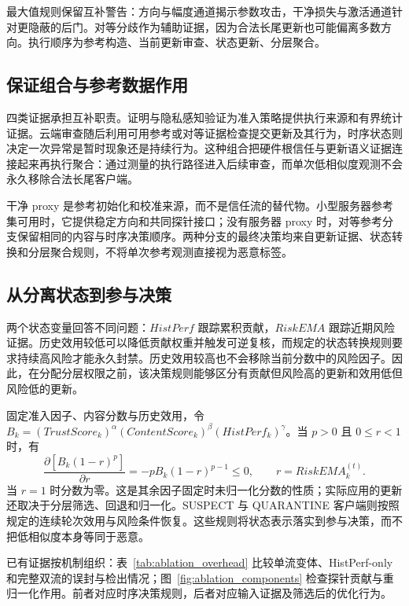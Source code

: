 \documentclass[10pt,a4paper,UTF8,fontset=fandol]{ctexart}
\begin{document}
最大值规则保留互补警告：方向与幅度通道揭示参数攻击，干净损失与激活通道针对更隐蔽的后门。对等分歧作为辅助证据，因为合法长尾更新也可能偏离多数方向。执行顺序为参考构造、当前更新审查、状态更新、分层聚合。

\subsection{保证组合与参考数据作用}

四类证据承担互补职责。证明与隐私感知验证为准入策略提供执行来源和有界统计证据。云端审查随后利用可用参考或对等证据检查提交更新及其行为，时序状态则决定一次异常是暂时现象还是持续行为。这种组合把硬件根信任与更新语义证据连接起来再执行聚合：通过测量的执行路径进入后续审查，而单次低相似度观测不会永久移除合法长尾客户端。

干净 proxy 是参考初始化和校准来源，而不是信任流的替代物。小型服务器参考集可用时，它提供稳定方向和共同探针接口；没有服务器 proxy 时，对等参考分支保留相同的内容与时序决策顺序。两种分支的最终决策均来自更新证据、状态转换和分层聚合规则，不将单次参考观测直接视为恶意标签。

\subsection{从分离状态到参与决策}

两个状态变量回答不同问题：$HistPerf$ 跟踪累积贡献，$RiskEMA$ 跟踪近期风险证据。历史效用较低可以降低贡献权重并触发可逆复核，而规定的状态转换规则要求持续高风险才能永久封禁。历史效用较高也不会移除当前分数中的风险因子。因此，在分配分层权限之前，该决策规则能够区分有贡献但风险高的更新和效用低但风险低的更新。

固定准入因子、内容分数与历史效用，令 $B_k=(TrustScore_k)^\alpha(ContentScore_k)^\beta(HistPerf_k)^\gamma$。当 $p>0$ 且 $0\leq r<1$ 时，有
\begin{equation}
 \frac{\partial [B_k(1-r)^p]}{\partial r}=-pB_k(1-r)^{p-1}\leq0,
 \qquad r=RiskEMA_k^{(t)}.
\end{equation}
当 $r=1$ 时分数为零。这是其余因子固定时未归一化分数的性质；实际应用的更新还取决于分层筛选、回退和归一化。SUSPECT 与 QUARANTINE 客户端则按照规定的连续轮次效用与风险条件恢复。这些规则将状态表示落实到参与决策，而不把低相似度本身等同于恶意。

已有证据按机制组织：表~\ref{tab:ablation_overhead} 比较单流变体、HistPerf-only 和完整双流的误封与检出情况；图~\ref{fig:ablation_components} 检查探针贡献与重归一化作用。前者对应时序决策规则，后者对应输入证据及筛选后的优化行为。
\end{document}
